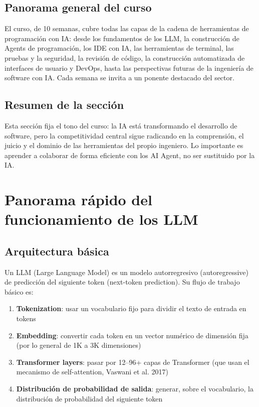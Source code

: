 \documentclass[a4paper]{article}
\begin{document}
\subsection{Panorama general del curso}

El curso, de 10 semanas, cubre todas las capas de la cadena de herramientas de programación con IA: desde los fundamentos de los LLM, la construcción de Agents de programación, los IDE con IA, las herramientas de terminal, las pruebas y la seguridad, la revisión de código, la construcción automatizada de interfaces de usuario y DevOps, hasta las perspectivas futuras de la ingeniería de software con IA. Cada semana se invita a un ponente destacado del sector.

\subsection{Resumen de la sección}

Esta sección fija el tono del curso: la IA está transformando el desarrollo de software, pero la competitividad central sigue radicando en la comprensión, el juicio y el dominio de las herramientas del propio ingeniero. Lo importante es aprender a colaborar de forma eficiente con los AI Agent, no ser sustituido por la IA.
\section{Panorama rápido del funcionamiento de los LLM}

\subsection{Arquitectura básica}

Un LLM (Large Language Model) es un modelo autorregresivo (autoregressive) de predicción del siguiente token (next-token prediction). Su flujo de trabajo básico es:

\begin{enumerate}
    \item \textbf{Tokenization}: usar un vocabulario fijo para dividir el texto de entrada en tokens
    \item \textbf{Embedding}: convertir cada token en un vector numérico de dimensión fija (por lo general de 1K a 3K dimensiones)
    \item \textbf{Transformer layers}: pasar por 12--96+ capas de Transformer (que usan el mecanismo de self-attention, Vaswani et al. 2017)
    \item \textbf{Distribución de probabilidad de salida}: generar, sobre el vocabulario, la distribución de probabilidad del siguiente token
\end{enumerate}
\end{document}
